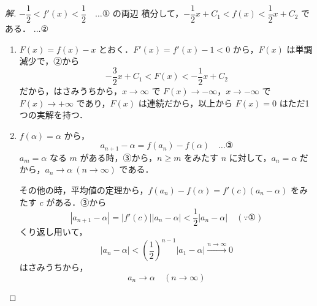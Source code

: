 \documentclass[../main.tex]{subfiles}
\begin{document}
\begin{proof}[解]
  $-\dfrac{1}{2} < f'(x) < \dfrac{1}{2} \quad \dots \text{①}$ の両辺 積分して，$-\dfrac{1}{2}x + C_1 < f(x) < \dfrac{1}{2}x + C_2$ である． $\dots \text{②}$

  \begin{enumerate}[(1)]
    \item $F(x) = f(x) - x$ とおく．$F'(x) = f'(x) - 1 < 0$ から，$F(x)$ は単調減少で，②から
      \[
        -\frac{3}{2}x + C_1 < F(x) < -\frac{1}{2}x + C_2
      \]
      だから，はさみうちから，$x \to \infty$ で $F(x) \to -\infty$，$x \to -\infty$ で $F(x) \to +\infty$ であり，$F(x)$ は連続だから，以上から $F(x) = 0$ はただ1つの実解を持つ．

    \item $f(\alpha) = \alpha$ から，
      \[
        a_{n+1} - \alpha = f(a_n) - f(\alpha) \quad \dots \text{③}
      \]
      $a_m = \alpha$ なる $m$ がある時，③から，$n \ge m$ をみたす $n$ に対して，$a_n = \alpha$ だから，$a_n \to \alpha \ (n \to \infty)$ である．

      その他の時，平均値の定理から，$f(a_n) - f(\alpha) = f'(c)(a_n - \alpha)$ をみたす $c$ がある．③から
      \[
        |a_{n+1} - \alpha| = |f'(c)||a_n - \alpha| < \frac{1}{2}|a_n - \alpha| \quad (\because \text{①})
      \]
      くり返し用いて，
      \[
        |a_n - \alpha| < \left(\frac{1}{2}\right)^{n-1}|a_1 - \alpha| \xrightarrow{n \to \infty} 0
      \]
      はさみうちから，
      \[
        a_n \longrightarrow \alpha \quad (n \to \infty)
      \]
  \end{enumerate}
\end{proof}
\end{document}
